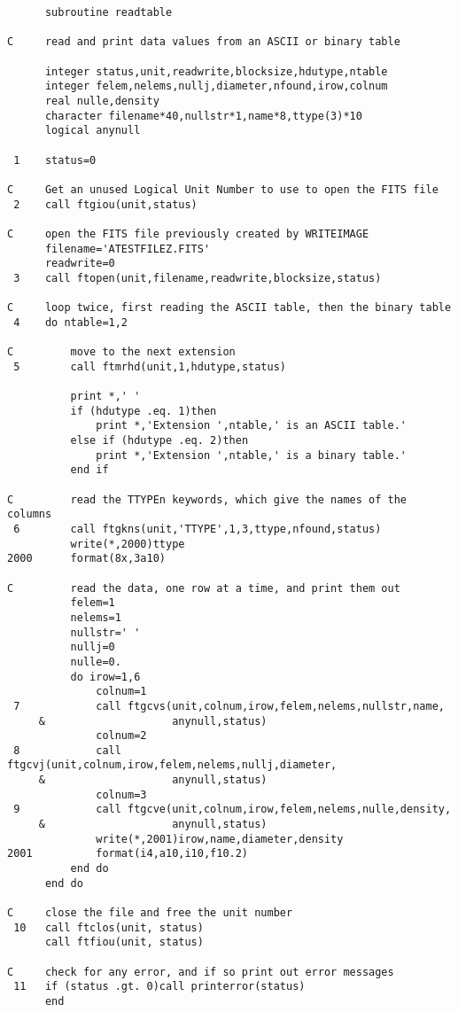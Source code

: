 \begin{verbatim}
      subroutine readtable

C     read and print data values from an ASCII or binary table

      integer status,unit,readwrite,blocksize,hdutype,ntable
      integer felem,nelems,nullj,diameter,nfound,irow,colnum
      real nulle,density
      character filename*40,nullstr*1,name*8,ttype(3)*10
      logical anynull

 1    status=0

C     Get an unused Logical Unit Number to use to open the FITS file
 2    call ftgiou(unit,status)

C     open the FITS file previously created by WRITEIMAGE
      filename='ATESTFILEZ.FITS'
      readwrite=0
 3    call ftopen(unit,filename,readwrite,blocksize,status)

C     loop twice, first reading the ASCII table, then the binary table
 4    do ntable=1,2

C         move to the next extension
 5        call ftmrhd(unit,1,hdutype,status)

          print *,' '
          if (hdutype .eq. 1)then
              print *,'Extension ',ntable,' is an ASCII table.'
          else if (hdutype .eq. 2)then
              print *,'Extension ',ntable,' is a binary table.'
          end if

C         read the TTYPEn keywords, which give the names of the columns
 6        call ftgkns(unit,'TTYPE',1,3,ttype,nfound,status)
          write(*,2000)ttype
2000      format(8x,3a10)

C         read the data, one row at a time, and print them out
          felem=1
          nelems=1
          nullstr=' '
          nullj=0
          nulle=0.
          do irow=1,6
              colnum=1
 7            call ftgcvs(unit,colnum,irow,felem,nelems,nullstr,name,
     &                    anynull,status)
              colnum=2
 8            call ftgcvj(unit,colnum,irow,felem,nelems,nullj,diameter,
     &                    anynull,status)
              colnum=3
 9            call ftgcve(unit,colnum,irow,felem,nelems,nulle,density,
     &                    anynull,status)
              write(*,2001)irow,name,diameter,density
2001          format(i4,a10,i10,f10.2)
          end do
      end do

C     close the file and free the unit number
 10   call ftclos(unit, status)
      call ftfiou(unit, status)

C     check for any error, and if so print out error messages
 11   if (status .gt. 0)call printerror(status)
      end
\end{verbatim}
\normalsize
\newpage
